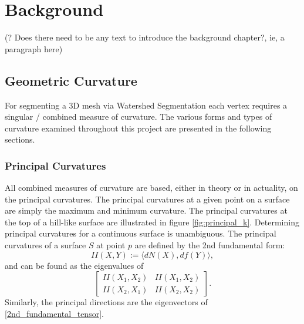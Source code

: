 \chapter{Background}\label{background}
(? Does there need to be any text to introduce the background chapter?, ie, a paragraph here)

\section{Geometric Curvature}
For segmenting a 3D mesh via Watershed Segmentation each vertex requires a singular / combined measure of curvature.
The various forms and types of curvature examined throughout this project are presented in the following sections.

\subsection{Principal Curvatures}
All combined measures of curvature are based, either in theory or in actuality, on the principal curvatures.
The principal curvatures at a given point on a surface are simply the maximum and minimum curvature\cite{DDGAppIntro_17_smooth_k}.
The principal curvatures at the top of a hill-like surface are illustrated in figure \ref{fig:principal_k}.
Determining principal curvatures for a continuous surface is unambiguous.
The principal curvatures of a surface $S$ at point $p$ are defined by the 2nd fundamental form\cite{DiffGeo_curves_surfaces, Basic_diff_geo_of_surfaces, DDGAppIntro_17_smooth_k}:
\begin{equation}
	II(X,Y) := \langle dN(X), df(Y)\rangle,
\end{equation}
and can be found as the eigenvalues of
\begin{equation}\label{2nd_fundamental_tensor}
	\begin{bmatrix}
		II(X_1, X_2) & II(X_1, X_2) \\
		II(X_2, X_1) & II(X_2, X_2)
	\end{bmatrix}.
\end{equation}
Similarly, the principal directions are the eigenvectors of \ref{2nd_fundamental_tensor}.


